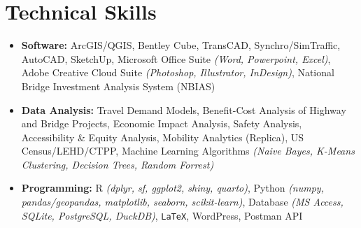 \section{ \textbf{ Technical Skills}}
    \begin{itemize}[leftmargin=0.15in, label={-}]
    	\item{\textbf{Software: }{ArcGIS/QGIS, Bentley Cube, TransCAD, Synchro/SimTraffic, AutoCAD, SketchUp, Microsoft Office Suite \textit{(Word, Powerpoint, Excel)}, Adobe Creative Cloud Suite \textit{(Photoshop, Illustrator, InDesign)}, National Bridge Investment Analysis System (NBIAS)}} \\
        \item{\textbf{Data Analysis: }{Travel Demand Models, Benefit-Cost Analysis of Highway and Bridge Projects, Economic Impact Analysis, Safety Analysis, Accessibility \& Equity Analysis, Mobility Analytics (Replica), US Census/LEHD/CTPP, Machine Learning Algorithms \textit{(Naive Bayes, K-Means Clustering, Decision Trees, Random Forrest)}}} \\
        \item{\textbf{Programming: }{R \textit{(dplyr, sf, ggplot2, shiny, quarto)}, Python \textit{(numpy, pandas/geopandas, matplotlib, seaborn, scikit-learn)}, Database \textit{(MS Access, SQLite, PostgreSQL, DuckDB)}, \texttt{\LaTeX}, WordPress, Postman API}}
    \end{itemize}